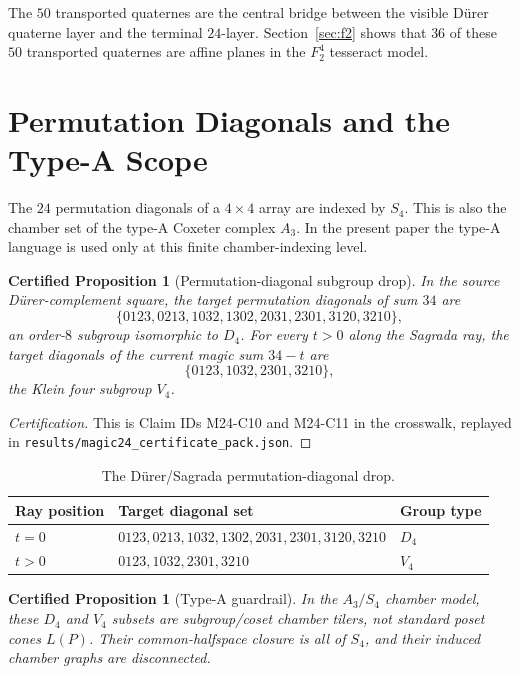 \documentclass[11pt,a4paper]{article}
\newtheorem{certprop}[theorem]{Certified Proposition}
\theoremstyle{definition}
\theoremstyle{remark}
\newcommand{\Durer}{D\"urer\xspace}
\begin{document}
The \(50\) transported quaternes are the central bridge between the visible
\Durer quaterne layer and the terminal \(24\)-layer.  Section~\ref{sec:f2}
shows that \(36\) of these \(50\) transported quaternes are affine planes in
the \(F_2^4\) tesseract model.

\section{Permutation Diagonals and the Type-A Scope}
\label{sec:s4}

The \(24\) permutation diagonals of a \(4\times4\) array are indexed by
\(S_4\).  This is also the chamber set of the type-A Coxeter complex \(A_3\).
In the present paper the type-A language is used only at this finite
chamber-indexing level.

\begin{certprop}[Permutation-diagonal subgroup drop]
\label{prop:d4-v4}
In the source \Durer-complement square, the target permutation diagonals of
sum \(34\) are
\[
\{0123,0213,1032,1302,2031,2301,3120,3210\},
\]
an order-\(8\) subgroup isomorphic to \(D_4\).  For every \(t>0\) along the
Sagrada ray, the target diagonals of the current magic sum \(34-t\) are
\[
\{0123,1032,2301,3210\},
\]
the Klein four subgroup \(V_4\).
\end{certprop}

\begin{proof}[Certification]
This is Claim IDs M24-C10 and M24-C11 in the crosswalk, replayed in
\texttt{results/magic24\_certificate\_pack.json}.
\end{proof}

\begin{table}[htbp]
\centering
\begin{tabular}{lll}
\toprule
Ray position & Target diagonal set & Group type\\
\midrule
\(t=0\) & \(0123,0213,1032,1302,2031,2301,3120,3210\) & \(D_4\)\\
\(t>0\) & \(0123,1032,2301,3210\) & \(V_4\)\\
\bottomrule
\end{tabular}
\caption{The \Durer/Sagrada permutation-diagonal drop.}
\label{tab:d4-v4}
\end{table}

\begin{certprop}[Type-A guardrail]
\label{prop:type-a-guardrail}
In the \(A_3/S_4\) chamber model, these \(D_4\) and \(V_4\) subsets are
subgroup/coset chamber tilers, not standard poset cones \(L(P)\).  Their
common-halfspace closure is all of \(S_4\), and their induced chamber graphs
are disconnected.
\end{certprop}
\end{document}
